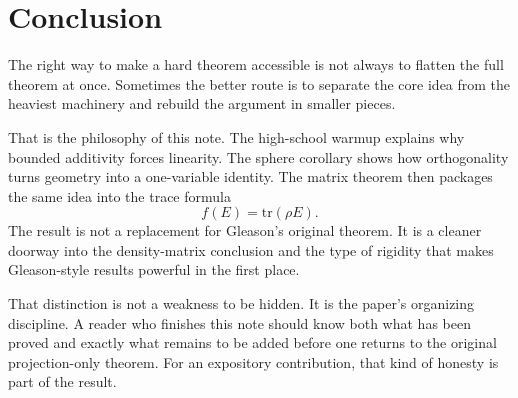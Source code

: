 \section{Conclusion}

The right way to make a hard theorem accessible is not always to flatten the full theorem at once. Sometimes the better route is to separate the core idea from the heaviest machinery and rebuild the argument in smaller pieces.

That is the philosophy of this note. The high-school warmup explains why bounded additivity forces linearity. The sphere corollary shows how orthogonality turns geometry into a one-variable identity. The matrix theorem then packages the same idea into the trace formula
\[
f(E)=\mathrm{tr}(\rho E).
\]
The result is not a replacement for Gleason's original theorem. It is a cleaner doorway into the density-matrix conclusion and the type of rigidity that makes Gleason-style results powerful in the first place.

That distinction is not a weakness to be hidden. It is the paper's organizing discipline. A reader who finishes this note should know both what has been proved and exactly what remains to be added before one returns to the original projection-only theorem. For an expository contribution, that kind of honesty is part of the result.
